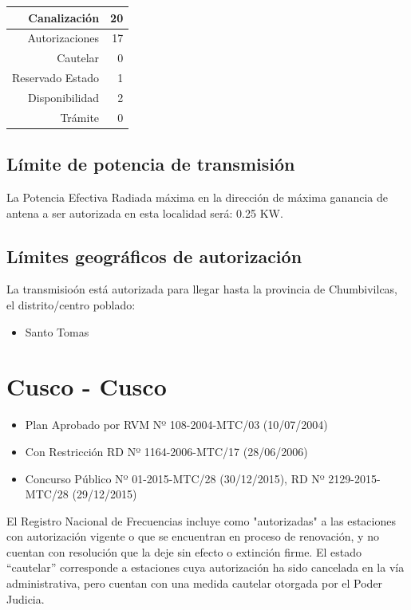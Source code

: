 \documentclass[11pt]{article}
\begin{document}
\begin{tabular}{|r|r|} \hline
	Canalización 			& 20 \\ \hline
	Autorizaciones			& 17 \\ \hline
	Cautelar				& 0 \\ \hline
	Reservado Estado		& 1 \\ \hline
	Disponibilidad			& 2 \\ \hline
	Trámite					& 0 \\ \hline 
\end{tabular}

\subsection{Límite de potencia de transmisión}

La Potencia Efectiva Radiada máxima en la dirección de máxima ganancia de antena a ser autorizada en esta localidad será: 0.25 KW.

\subsection{Límites geográficos de autorización}

La transmisioón está autorizada para llegar hasta la provincia de Chumbivilcas, el distrito/centro poblado:

\begin{itemize}
	\item Santo Tomas
\end{itemize}



\section{Cusco - Cusco}

\begin{itemize}
	\item Plan Aprobado por RVM Nº 108-2004-MTC/03 (10/07/2004)
	\item Con Restricción RD Nº 1164-2006-MTC/17 (28/06/2006)
	\item Concurso Público Nº 01-2015-MTC/28 (30/12/2015), RD Nº 2129-2015-MTC/28 (29/12/2015)
\end{itemize}

El Registro Nacional de Frecuencias incluye como "autorizadas" a las estaciones con autorización vigente o que se encuentran en proceso de renovación, y no cuentan con resolución que la deje sin efecto o extinción firme. El estado “cautelar” corresponde a estaciones cuya autorización ha sido cancelada en la vía administrativa, pero cuentan con una medida cautelar otorgada por el Poder Judicia.
\end{document}
